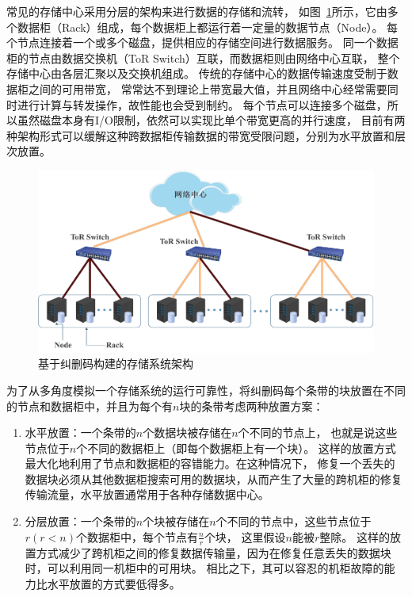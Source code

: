 常见的存储中心采用分层的架构来进行数据的存储和流转，
如图~\ref{fig:5-1}所示，它由多个数据柜（Rack）组成，每个数据柜上都运行着一定量的数据节点（Node）。 
每个节点连接着一个或多个磁盘，提供相应的存储空间进行数据服务。 
同一个数据柜的节点由数据交换机（ToR Switch）互联，而数据柜则由网络中心互联，
整个存储中心由各层汇聚以及交换机组成。 传统的存储中心的数据传输速度受制于数据柜之间的可用带宽，
常常达不到理论上带宽最大值，并且网络中心经常需要同时进行计算与转发操作，故性能也会受到制约。 
每个节点可以连接多个磁盘，所以虽然磁盘本身有I/O限制，依然可以实现比单个带宽更高的并行速度，
目前有两种架构形式可以缓解这种跨数据柜传输数据的带宽受限问题，分别为水平放置和层次放置。
\begin{figure}[tb!]
	\centering
	\includegraphics [scale=0.4]{figures/5-1.pdf}
	\caption{基于纠删码构建的存储系统架构}
	\label{fig:5-1}
\end{figure}

为了从多角度模拟一个存储系统的运行可靠性，将纠删码每个条带的块放置在不同的节点和数据柜中，并且为每个有$n$块的条带考虑两种放置方案：
\begin{enumerate}
    \item 水平放置：一个条带的$n$个数据块被存储在$n$个不同的节点上，
            也就是说这些节点位于$n$个不同的数据柜上（即每个数据柜上有一个块）。 
            这样的放置方式最大化地利用了节点和数据柜的容错能力。在这种情况下，
            修复一个丢失的数据块必须从其他数据柜搜索可用的数据块，从而产生了大量的跨机柜的修复传输流量，水平放置通常用于各种存储数据中心。
    \item 分层放置：一个条带的$n$个块被存储在$n$个不同的节点中，这些节点位于$r(r<n)$个数据柜中，每个节点有$\frac{n}{r}$个块，
            这里假设$n$能被$r$整除。 
            这样的放置方式减少了跨机柜之间的修复数据传输量，因为在修复任意丢失的数据块时，可以利用同一机柜中的可用块。
            相比之下，其可以容忍的机柜故障的能力比水平放置的方式要低得多。
\end{enumerate}

